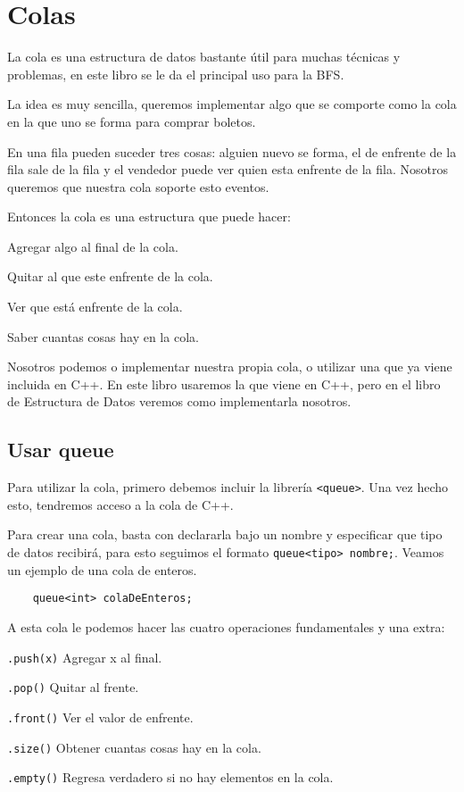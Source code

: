 \newpage
\section*{Colas}
\label{queue}
La cola es una estructura de datos bastante útil para muchas técnicas y problemas, en este libro se le da el principal uso para la BFS.

La idea es muy sencilla, queremos implementar algo que se comporte como la cola en la que uno se forma para comprar boletos.

En una fila pueden suceder tres cosas: alguien nuevo se forma, el de enfrente de la fila sale de la fila y el vendedor puede ver quien esta enfrente de la fila. Nosotros queremos que nuestra cola soporte esto eventos.

Entonces la cola es una estructura que puede hacer:
\begin{plimits}
	\item Agregar algo al final de la cola.
	\item Quitar al que este enfrente de la cola.
	\item Ver que está enfrente de la cola.
	\item Saber cuantas cosas hay en la cola.
\end{plimits}

Nosotros podemos o implementar nuestra propia cola, o utilizar una que ya viene incluida en C++. En este libro usaremos la que viene en C++, pero en el libro de Estructura de Datos veremos como implementarla nosotros.

\subsection*{Usar queue}

Para utilizar la cola, primero debemos incluir la librería \verb|<queue>|. Una vez hecho esto, tendremos acceso a la cola de C++.

Para crear una cola, basta con declararla bajo un nombre y especificar que tipo de datos recibirá, para esto seguimos el formato \verb|queue<tipo> nombre;|. Veamos un ejemplo de una cola de enteros.

\begin{lstlisting}
	queue<int> colaDeEnteros;
\end{lstlisting}

A esta cola le podemos hacer las cuatro operaciones fundamentales y una extra:
\begin{plimits}
	\item \verb|.push(x)| Agregar x al final.
	\item \verb|.pop()| Quitar al frente.
	\item \verb|.front()| Ver el valor de enfrente.
	\item \verb|.size()| Obtener cuantas cosas hay en la cola.
	\item \verb|.empty()| Regresa verdadero si no hay elementos en la cola.
\end{plimits}


